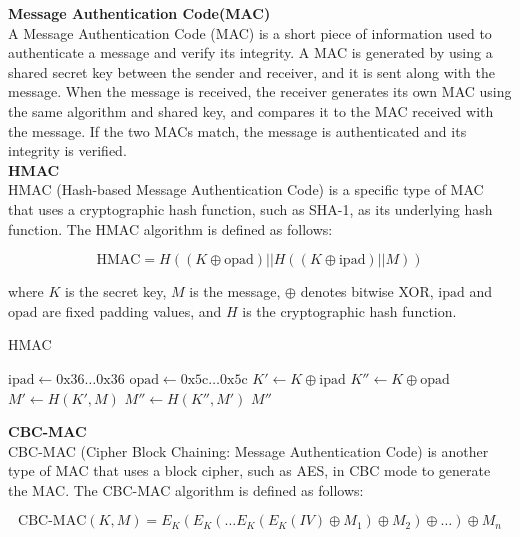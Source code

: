 \documentclass[11pt]{article}
\begin{document}
\textbf{Message Authentication Code(MAC)}\\
A Message Authentication Code (MAC) is a short piece of information used to authenticate a message and verify its integrity. A MAC is generated by using a shared secret key between the sender and receiver, and it is sent along with the message. When the message is received, the receiver generates its own MAC using the same algorithm and shared key, and compares it to the MAC received with the message. If the two MACs match, the message is authenticated and its integrity is verified.\\
\textbf{HMAC}\\
HMAC (Hash-based Message Authentication Code) is a specific type of MAC that uses a cryptographic hash function, such as SHA-1, as its underlying hash function. The HMAC algorithm is defined as follows:

$$\text{HMAC} = H((K \oplus \text{opad}) || H((K \oplus \text{ipad}) || M))$$

where $K$ is the secret key, $M$ is the message, $\oplus$ denotes bitwise XOR, $\text{ipad}$ and $\text{opad}$ are fixed padding values, and $H$ is the cryptographic hash function.

\begin{algorithm}
\caption{HMAC}
\begin{algorithmic}[1]
\State $\text{ipad} \gets \text{0x36} \ldots \text{0x36}$
\State $\text{opad} \gets \text{0x5c} \ldots \text{0x5c}$
\State $K' \gets K \oplus \text{ipad}$
\State $K'' \gets K \oplus \text{opad}$
\State $M' \gets H(K', M)$
\State $M'' \gets H(K'', M')$
\State \Return $M''$
\EndProcedure
\end{algorithmic}
\end{algorithm}

\textbf{CBC-MAC}\\

CBC-MAC (Cipher Block Chaining: Message Authentication Code) is another type of MAC that uses a block cipher, such as AES, in CBC mode to generate the MAC. The CBC-MAC algorithm is defined as follows:

$$\text{CBC-MAC}(K, M) = E_K(E_K(\ldots E_K(E_K(IV) \oplus M_1) \oplus M_2) \oplus \ldots) \oplus M_n$$
\end{document}
